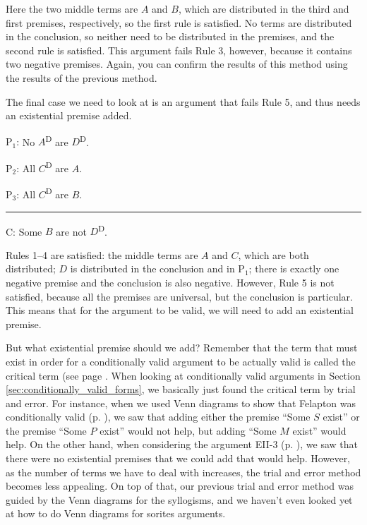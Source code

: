 Here the two middle terms are $A$ and $B$, which are distributed in the third and first premises, respectively, so the first rule is satisfied. No terms are distributed in the conclusion, so neither need to be distributed in the premises, and the second rule is satisfied. This argument fails Rule 3, however, because it contains two negative premises. Again, you can confirm the results of this method using the results of the previous method. 

The final case we need to look at is an argument that fails Rule 5, and thus needs an existential premise added. 

\begin{earg}
\item[P$_1$:] No $A$\textsuperscript{D} are $D$\textsuperscript{D}. 
\item[P$_2$:] All $C$\textsuperscript{D} are $A$.  %
\item[P$_3$:] All $C$\textsuperscript{D} are $B$. 
\vspace{-.5em}
\item [] \rule{0.3\linewidth}{.5pt} 
\item[C:] Some $B$ are not $D$\textsuperscript{D}. %
\end{earg} 

Rules 1--4 are satisfied: the middle terms are $A$ and $C$, which are both distributed; $D$ is distributed in the conclusion and in P$_1$; there is exactly one negative premise and the conclusion is also negative. However, Rule 5 is not satisfied, because all the premises are universal, but the conclusion is particular. This means that for the argument to be valid, we will need to add an existential premise. 

But what existential premise should we add? Remember that the term that must exist in order for a conditionally valid argument to be actually valid is called the critical term (see page \pageref{def:critical_term}. When looking at conditionally valid arguments in Section \ref{sec:conditionally_valid_forms}, we basically just found the critical term by trial and error. For instance, when we used Venn diagrams to show that Felapton was conditionally valid (p. \pageref{CVFex2}), we saw that adding either the premise ``Some $S$ exist'' or the premise ``Some $P$ exist'' would not help, but adding ``Some $M$ exist'' would help. On the other hand, when considering the argument EII-3 (p. \pageref{CVFex3}), we saw that there were no existential premises that we could add that would help. However, as the number of terms we have to deal with increases, the trial and error method becomes less appealing. On top of that, our previous trial and error method was guided by the Venn diagrams for the syllogisms, and we haven't even looked yet at how to do Venn diagrams for sorites arguments. 


